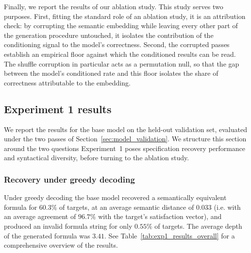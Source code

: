 \documentclass[titlepage,a4paper,11pt]{report}
\begin{document}
    Finally, we report the results of our ablation study. This study serves two purposes. First, fitting the standard role of an ablation study, it is an attribution check: by corrupting the semantic embedding while leaving every other part of the generation procedure untouched, it isolates the contribution of the conditioning signal to the model's correctness. Second, the corrupted passes establish an empirical floor against which the conditioned results can be read. The shuffle corruption in particular acts as a permutation null, so that the gap between the model's conditioned rate and this floor isolates the share of correctness attributable to the embedding.

    
    \subsection{Experiment 1 results}\label{sec:exp1_results}
    We report the results for the base model on the held-out validation set, evaluated under the two passes of Section~\ref{sec:model_validation}. We structure this section around the two questions Experiment~1 poses specification recovery performance and syntactical diversity, before turning to the ablation study.
    
    \subsubsection{Recovery under greedy decoding}
    Under greedy decoding the base model recovered a semantically equivalent formula for $60.3\%$ of targets, at an average semantic distance of $0.033$ (i.e. with an average agreement of $96.7\%$ with the target's satisfaction vector), and produced an invalid formula string for only $0.55\%$ of targets. The average depth of the generated formula was $3.41$. See Table~\ref{tab:exp1_results_overall} for a comprehensive overview of the results.
    
\end{document}
